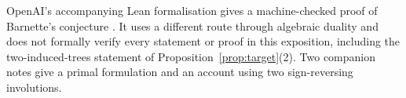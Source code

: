 \documentclass[10pt]{amsart}
\numberwithin{equation}{section}
\theoremstyle{definition}
\theoremstyle{remark}
\begin{document}
OpenAI's accompanying Lean formalisation gives a machine-checked proof of Barnette's conjecture \cite{OpenAI2026b}.
It uses a different route through algebraic duality and does not formally verify every statement or proof in this exposition, including the two-induced-trees statement of Proposition~\ref{prop:target}(2).
Two companion notes give a primal formulation and an account using two sign-reversing involutions.



\end{document}
